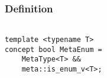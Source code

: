 
\subsubsection{Definition}

\begin{verbatim}

template <typename T>
concept bool MetaEnum =
	MetaType<T> &&
	meta::is_enum_v<T>;

\end{verbatim}

